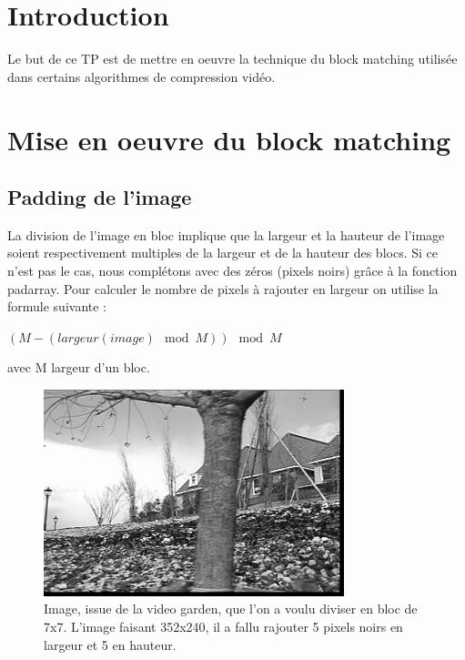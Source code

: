 \documentclass[a4paper, 12pt]{article}
\begin{document}






\clearpage

\section{Introduction}

Le but de ce TP est de mettre en oeuvre la technique du block matching utilisée dans certains algorithmes de compression vidéo.

\section{Mise en oeuvre du block matching}

\subsection{Padding de l'image}

La division de l'image en bloc implique que la largeur et la hauteur de l'image soient respectivement multiples de la largeur et de la hauteur des blocs. Si ce n'est pas le cas, nous complétons avec des zéros (pixels noirs) grâce à la fonction padarray. Pour calculer le nombre de pixels à rajouter en largeur on utilise la formule suivante : \\

\begin{center}
	$(M - (largeur(image) \mod M)) \mod M$ \\
\end{center}
avec M largeur d'un bloc.

\begin{figure}[H]
	\centering
		\includegraphics[height=6cm]{../Resultats/Garden/garden_padding.jpg}
	\caption{Image, issue de la video garden, que l'on a voulu diviser en bloc de 7x7. L'image faisant 352x240, il a fallu rajouter 5 pixels noirs en largeur et 5 en hauteur.}
	\label{fig:padding}
\end{figure}
\end{document}
